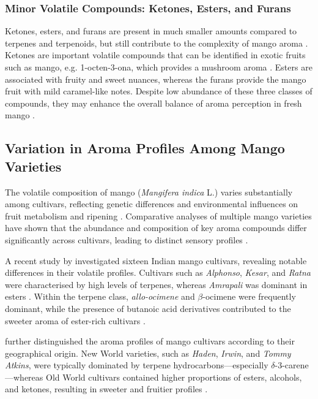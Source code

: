 \subsubsection{Minor Volatile Compounds: Ketones, Esters, and Furans}
Ketones, esters, and furans are present in much smaller amounts compared to terpenes and terpenoids, but still contribute to the complexity of mango aroma \cite*{A07_Bonneau2016}. Ketones are important volatile compounds that can be identified in exotic fruits such as mango, e.g. 1-octen-3-ona, which provides a mushroom aroma \cite*{A01_Aguirre-Lopez_2023}. Esters are associated with fruity and sweet nuances, whereas the furans provide the mango fruit with mild caramel-like notes. Despite low abundance of these three classes of compounds, they may enhance the overall balance of aroma perception in fresh mango \cite*{A13_ElHadi2013}.

\subsection{Variation in Aroma Profiles Among Mango Varieties}
The volatile composition of mango (\textit{Mangifera indica} L.) varies substantially among cultivars, reflecting genetic differences and environmental influences on fruit metabolism and ripening \cite*{A01_Aguirre-Lopez_2023}. Comparative analyses of multiple mango varieties have shown that the abundance and composition of key aroma compounds differ significantly across cultivars, leading to distinct sensory profiles \cite*{A01_Aguirre-Lopez_2023,A02_Moreno2010}. 

\vspace{0.5em}
A recent study by \textcite{A16_Tandel2023} investigated sixteen Indian mango cultivars, revealing notable differences in their volatile profiles. Cultivars such as \textit{Alphonso}, \textit{Kesar}, and \textit{Ratna} were characterised by high levels of terpenes, whereas \textit{Amrapali} was dominant in esters \cite*{A16_Tandel2023}. Within the terpene class, \textit{allo-ocimene} and $\beta$-ocimene were frequently dominant, while the presence of butanoic acid derivatives contributed to the sweeter aroma of ester-rich cultivars \cite*{A16_Tandel2023}. 

\vspace{0.5em}
\textcite{A13_ElHadi2013} further distinguished the aroma profiles of mango cultivars according to their geographical origin. New World varieties, such as \textit{Haden}, \textit{Irwin}, and \textit{Tommy Atkins}, were typically dominated by terpene hydrocarbons—especially $\delta$-3-carene—whereas Old World cultivars contained higher proportions of esters, alcohols, and ketones, resulting in sweeter and fruitier profiles \cite*{A13_ElHadi2013}. 


